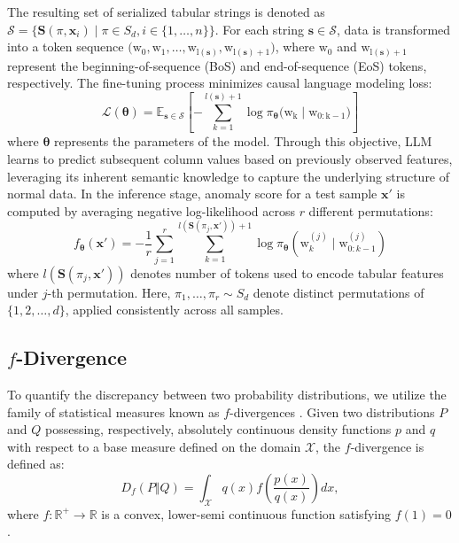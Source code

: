 The resulting set of serialized tabular strings is denoted as $\mathcal{S} = \{\mathbf{S}(\pi, \mathbf{x}_i) \mid \pi \in S_d, i \in \{1, \dots, n\}\}$. For each string $\mathbf{s} \in \mathcal{S}$, data is transformed into a token sequence $(\mathrm{w_0}, \mathrm{w_1}, \dots, \mathrm{w_{l(\mathbf{s})}}, \mathrm{w_{l(\mathbf{s})+1})}$, where $\mathrm{w_0}$ and $\mathrm{w_{l(\mathbf{s})+1}}$ represent the beginning-of-sequence (BoS) and end-of-sequence (EoS) tokens, respectively. The fine-tuning process minimizes causal language modeling loss:
\begin{equation}
\mathcal{L}(\boldsymbol{\theta}) = \mathbb{E}_{\mathbf{s} \in \mathcal{S}} \left[ -\sum_{k=1}^{l(\mathbf{s})+1} \log \pi_{\boldsymbol{\theta}}(\mathrm{w_k} \mid \mathrm{w_{0:k-1})} \right]
\end{equation}
where $\boldsymbol{\theta}$ represents the parameters of the model. Through this objective, LLM learns to predict subsequent column values based on previously observed features, leveraging its inherent semantic knowledge to capture the underlying structure of normal data. In the inference stage, anomaly score for a test sample $\mathbf{x}'$ is computed by averaging negative log-likelihood across $r$ different permutations:
\begin{equation}
f_{\boldsymbol{\theta}}(\mathbf{x}') =
- \frac{1}{r} \sum_{j=1}^{r}
\sum_{k=1}^{l(\mathbf{S}(\pi_j, \mathbf{x}'))+1}
\log \pi_{\boldsymbol{\theta}}(\mathrm{w}^{(j)}_k \mid \mathrm{w}^{(j)}_{0:k-1})
\end{equation}
where $l(\mathbf{S}(\pi_j, \mathbf{x}'))$ denotes number of tokens used to encode tabular features under $j$-th permutation. Here, $\pi_1, \ldots, \pi_r \sim S_d$ denote distinct permutations of $\{1, 2, \ldots, d\}$, applied consistently across all samples.



\subsection{$f$-Divergence}
To quantify the discrepancy between two probability distributions, we utilize the family of statistical measures known as $f$-divergences \cite{Csiszar2004,Liese2006}. Given two distributions $P$ and $Q$ possessing, respectively, absolutely continuous density functions $p$ and $q$ with respect to a base measure defined on the domain $\mathcal{X}$, the $f$-divergence is defined as:
\begin{equation}
D_{f}\left(P\Vert Q\right)=\int_{\mathcal{X}}q(x)f\left(\frac{p(x)}{q(x)}\right)dx,
\end{equation}
where $f : \mathbb{R}^+ \rightarrow \mathbb{R}$ is a convex, lower-semi continuous function satisfying $f(1) = 0$.

